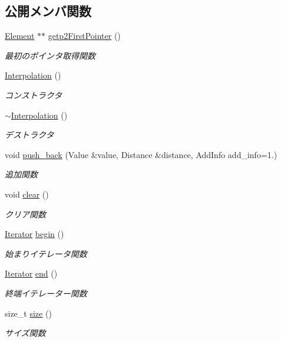 \subsection*{公開メンバ関数}
\begin{DoxyCompactItemize}
\item 
\mbox{\hyperlink{class_interpolation_a01e71544809483d7a2ee72fe0007bcb0}{Element}} $\ast$$\ast$ \mbox{\hyperlink{class_interpolation_a1562562e0809978e58ec0703f383174b}{getp2\+First\+Pointer}} ()
\begin{DoxyCompactList}\small\item\em 最初のポインタ取得関数 \end{DoxyCompactList}\item 
\mbox{\hyperlink{class_interpolation_a023b5a27fc450db2b2f19c881243cab6}{Interpolation}} ()
\begin{DoxyCompactList}\small\item\em コンストラクタ \end{DoxyCompactList}\item 
\mbox{\hyperlink{class_interpolation_a71961e7c2738236a592b73d59cf0efd6}{$\sim$\+Interpolation}} ()
\begin{DoxyCompactList}\small\item\em デストラクタ \end{DoxyCompactList}\item 
void \mbox{\hyperlink{class_interpolation_afdf10ef9db1671ac8df2ef3b6add234f}{push\+\_\+back}} (Value \&value, Distance \&distance, Add\+Info add\+\_\+info=1.)
\begin{DoxyCompactList}\small\item\em 追加関数 \end{DoxyCompactList}\item 
void \mbox{\hyperlink{class_interpolation_a2058fcb997b38b8813e7de2e581a20f4}{clear}} ()
\begin{DoxyCompactList}\small\item\em クリア関数 \end{DoxyCompactList}\item 
\mbox{\hyperlink{class_interpolation_a066eb9906faf7f1d56ba68d00c6be64a}{Iterator}} \mbox{\hyperlink{class_interpolation_a3d1c93d409027d14ca4c4373a81127dc}{begin}} ()
\begin{DoxyCompactList}\small\item\em 始まりイテレータ関数 \end{DoxyCompactList}\item 
\mbox{\hyperlink{class_interpolation_a066eb9906faf7f1d56ba68d00c6be64a}{Iterator}} \mbox{\hyperlink{class_interpolation_a9c63d39c9245a28228784ebff60ae4b1}{end}} ()
\begin{DoxyCompactList}\small\item\em 終端イテレーター関数 \end{DoxyCompactList}\item 
size\+\_\+t \mbox{\hyperlink{class_interpolation_a578f14e07599bb0673af9006d21d8d94}{size}} ()
\begin{DoxyCompactList}\small\item\em サイズ関数 \end{DoxyCompactList}\end{DoxyCompactItemize}

